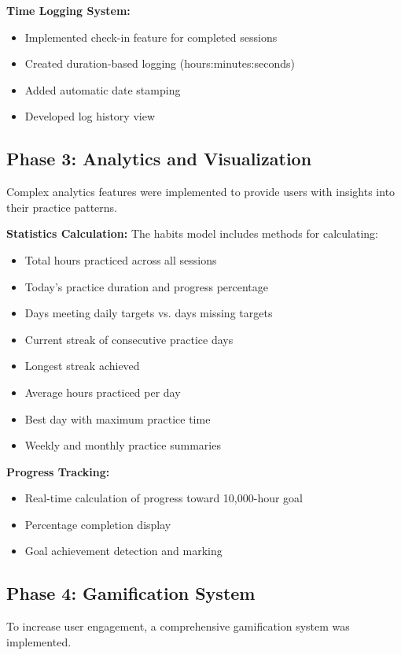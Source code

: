 \documentclass[12pt,a4paper]{report}
\newcommand{\JustifiedNormal}{\fontsize{12}{14}\selectfont\justifying\setlength{\parindent}{0pt}}
\begin{document}
\textbf{Time Logging System:}
\begin{itemize}
  \item Implemented check-in feature for completed sessions
  \item Created duration-based logging (hours:minutes:seconds)
  \item Added automatic date stamping
  \item Developed log history view
\end{itemize}

\subsection{Phase 3: Analytics and Visualization}
\JustifiedNormal
Complex analytics features were implemented to provide users with insights into their practice patterns.

\textbf{Statistics Calculation:}
The habits model includes methods for calculating:
\begin{itemize}
  \item Total hours practiced across all sessions
  \item Today's practice duration and progress percentage
  \item Days meeting daily targets vs. days missing targets
  \item Current streak of consecutive practice days
  \item Longest streak achieved
  \item Average hours practiced per day
  \item Best day with maximum practice time
  \item Weekly and monthly practice summaries
\end{itemize}

\textbf{Progress Tracking:}
\begin{itemize}
  \item Real-time calculation of progress toward 10,000-hour goal
  \item Percentage completion display
  \item Goal achievement detection and marking
\end{itemize}

\subsection{Phase 4: Gamification System}
\JustifiedNormal
To increase user engagement, a comprehensive gamification system was implemented.
\end{document}
